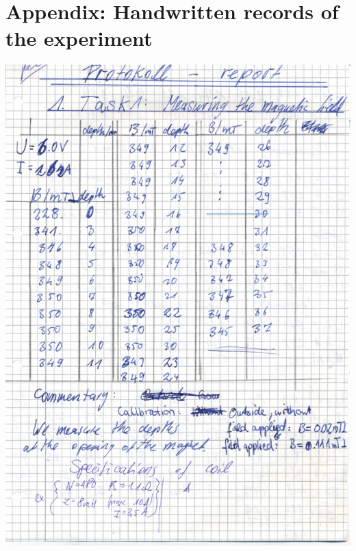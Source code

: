 \section{Appendix: Handwritten records of the experiment}
\label{sec:appendix}
    \includegraphics[width=\linewidth]{appendix/spin1}
\clearpage

